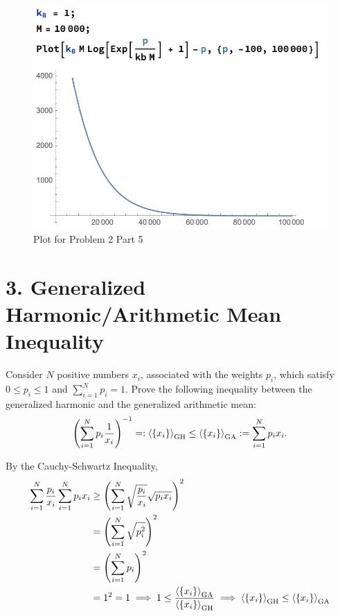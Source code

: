 \documentclass[a4paper,twoside]{article}
\begin{document}
\begin{itemize}
\begin{figure}[h]
            \includegraphics[width=\textwidth]{Midterm_Problem_2_Part_5.png}
            \caption{Plot for Problem 2 Part 5}
            \label{fig:problem_2_5}
        \end{figure}
\end{itemize}

\section*{3. Generalized Harmonic/Arithmetic Mean Inequality}
Consider $ N $ positive numbers $ x_i $, associated with the weights $ p_i $, which satisfy $ 0 \leq p_i \leq 1 $ and $ \sum_{i=1}^{N} p_i = 1 $. Prove the following inequality between the generalized harmonic and the generalized arithmetic mean:
\begin{equation}
    \left( \sum_{i=1}^{N} p_i \frac{1}{x_i} \right)^{-1} =: \ev{\{x_i\}}_{\text{GH}} \leq \ev{\{x_i\}}_{\text{GA}} := \sum_{i=1}^{N} p_i x_i.
\end{equation}
\begin{problem}
    By the Cauchy-Schwartz Inequality,
    \begin{align}
        \sum_{i=1}^{N} \frac{p_i}{x_i} \sum_{i=1}^{N} p_i x_i &\geq \left( \sum_{i=1}^{N} \sqrt{\frac{p_i}{x_i}} \sqrt{p_i x_i} \right)^2 \\
        &= \left( \sum_{i=1}^{N} \sqrt{p_i^2} \right)^2 \\
        &= \left( \sum_{i=1}^{N} p_i \right)^2 \\
        &= 1^2 = 1
        \implies 1 \leq \frac{\ev{\{x_i\}}_{\text{GA}}}{\ev{\{x_i\}}_{\text{GH}}} \implies \ev{\{x_i\}}_{\text{GH}} \leq \ev{\{x_i\}}_{\text{GA}}
    \end{align}
\end{problem}
\end{document}
